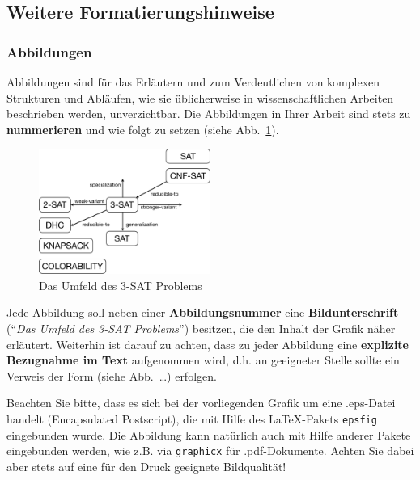 \subsection{Weitere Formatierungshinweise}
\subsubsection{Abbildungen}
Abbildungen sind für das Erläutern und zum Verdeutlichen von komplexen Strukturen und Abläufen, wie sie üblicherweise in wissenschaftlichen Arbeiten beschrieben werden, unverzichtbar.
Die Abbildungen in Ihrer Arbeit sind stets zu {\bf nummerieren} und wie folgt zu setzen (siehe Abb.~\ref{fig_Abb1}).
\begin{figure}[ht]
  \begin{center}
  \includegraphics[width=0.5\textwidth]{images/3sat.pdf}
  \end{center}
  \caption{Das Umfeld des 3-SAT Problems}
  \label{fig_Abb1}
\end{figure} 

Jede Abbildung soll neben einer \textbf{Abbildungsnummer} eine \textbf{Bildunterschrift} ("`\textit{Das Umfeld des 3-SAT Problems}"') besitzen, die den Inhalt der Grafik näher erläutert.
Weiterhin ist darauf zu achten, dass zu jeder Abbildung eine \textbf{explizite Bezugnahme im Text} aufgenommen wird, d.h. an geeigneter Stelle sollte ein Verweis der Form (siehe Abb.~\dots) erfolgen.

\smallskip

Beachten Sie bitte, dass es sich bei der vorliegenden Grafik um eine .eps-Datei handelt (Encapsulated Postscript), die mit Hilfe des \LaTeX-Pakets {\tt epsfig} eingebunden wurde.
Die Abbildung kann natürlich auch mit Hilfe anderer Pakete eingebunden werden, wie z.B. via {\tt graphicx} für .pdf-Dokumente.
Achten Sie dabei aber stets auf eine für den Druck geeignete Bildqualität!

\smallskip

